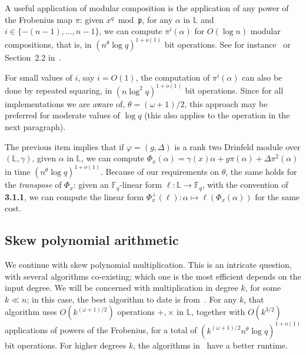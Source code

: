 \documentclass[sigconf]{acmart}
\newcommand{\F}{\mathbb{F}}
\renewcommand{\L}{\mathbb{L}}
\newcommand{\frakp}{\mathfrak{p}}
\begin{document}
\smallskip{}  A useful application of modular
composition is the application of any power of the Frobenius map
$\pi$: given $x^q \bmod \frakp$, for any $\alpha$ in $\L$ and $i \in
\{-(n-1),\dots,n-1\}$, we can compute $\pi^i(\alpha)$ for $O(\log n)$
modular compositions, that is, in $(n^\theta \log q)^{1+o(1)}$ bit
operations. See for instance~\cite[Algorithm~5.2]{vonzurGathen1992}
or Section~2.2 in~\cite{eschost2017arXiv171200669D}.

For small values of $i$, say $i=O(1)$, the computation of
$\pi^i(\alpha)$ can also be done by repeated squaring, in $(n \log^2
q)^{1+o(1)}$ bit operations.  Since for all implementations we are
aware of, $\theta=(\omega+1)/2$, this approach may be preferred for
moderate values of $\log q$ (this also applies to the operation in the
next paragraph).

\smallskip{} The previous item implies that if
$\varphi=(g,\Delta)$ is a rank two Drinfeld module over $(\L,\gamma)$,
given $\alpha$ in $\L$, we can compute $\Phi_x(\alpha) = \gamma(x)
\alpha + g \pi(\alpha) + \Delta \pi^2(\alpha)$ in time $(n^{\theta}
\log q)^{1+o(1)}$.  Because of our requirements on $\theta$, the same
holds for the {\em transpose} of $\Phi_x$: given an $\F_q$-linear form
$\ell:\L\to \F_q$, with the convention of {\bf 3.1.1}, we can compute
the linear form $\Phi_x^\perp(\ell): \alpha\mapsto
\ell(\Phi_x(\alpha))$ for the same cost.




\subsection{Skew polynomial arithmetic}

\smallskip{}  We continue with skew polynomial
multiplication. This is an intricate question, with several algorithms
co-existing; which one is the most efficient depends on the input
degree. We will be concerned with multiplication in degree $k$, for
some $k \ll n$; in this case, the best algorithm to date is
from~\cite[Th.~7]{PUCHINGER2017b}. For any $k$, that algorithm uses
$O(k^{(\omega+1)/2})$ operations $+,\times$ in $\L$, together with
$O(k^{3/2})$ applications of powers of the Frobenius, for a total of
$(k^{(\omega+1)/2} n^\theta \log q)^{1+o(1)}$ bit operations.  For
higher degrees $k$, the algorithms in~\cite{CaLe17} have a better
runtime.
\end{document}
